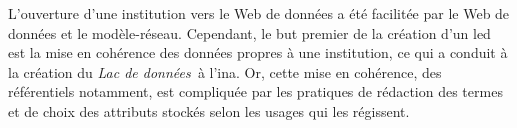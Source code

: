 \documentclass[a4paper,12pt,twoside]{book}
\newcommand{\ldd}{\textit{Lac de données~}}
\begin{document}
	L'ouverture d'une institution vers le Web de données a été facilitée par le Web de données et le modèle-réseau. Cependant, le but premier de la création d'un \ac{led} est la mise en cohérence des données propres à une institution, ce qui a conduit à la création du \ldd à l'\ac{ina}. Or, cette mise en cohérence, des référentiels notamment, est compliquée par les pratiques de rédaction des termes et de choix des attributs stockés selon les usages qui les régissent.

	
	
	
	
	\backmatter
	
	

\printindex[referentiels]
\printindex[ina]

	\listoffigures
	
	\listoftables

	\tableofcontents
	
\end{document}
